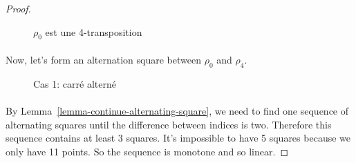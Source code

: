 \begin{proof}
\begin{figure}[H]
\begin{center}
\begin{tikzpicture}[scale=.8]
      \end{tikzpicture}
      \caption{$\rho_0$ est une 4-transposition}
    \end{center}
  \end{figure}

  \paragraph{}
  Now, let's form an alternation square between $\rho_0$ and $\rho_4$.

  \begin{figure}[H]
    \begin{center}
      \caption{Cas 1: carré alterné}
    \end{center}
  \end{figure}

  \paragraph{}
  By Lemma~\ref{lemma-continue-alternating-square}, we need to find one sequence of alternating squares until the difference between indices is two. Therefore this sequence contains at least 3 squares. It's impossible to have 5 squares because we only have 11 points. So the sequence is monotone and so linear.


\end{proof}
